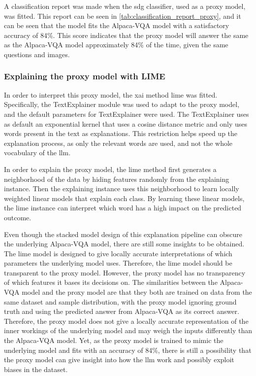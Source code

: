     A classification report was made when the \gls{sdg} classifier, used as a proxy model, was fitted. This report can be seen in \autoref{tab:classification_report_proxy}, and it can be seen that the model fits the Alpaca-VQA model with a satisfactory accuracy of 84\%. This score indicates that the proxy model will answer the same as the Alpaca-VQA model approximately 84\% of the time, given the same questions and images.

    


    \subsubsection{Explaining the proxy model with LIME}
    
    In order to interpret this proxy model, the \gls{xai} method \gls{lime} was fitted. Specifically, the TextExplainer module \cite{LimePackageLime} was used to adapt to the proxy model, and the default parameters for TextExplainer were used. The TextExplainer uses as default an exponential kernel that uses a cosine distance metric and only uses words present in the text as explanations. This restriction helps speed up the explanation process, as only the relevant words are used, and not the whole vocabulary of the \gls{llm}. 

    In order to explain the proxy model, the \gls{lime} method first generates a neighborhood of the data by hiding features randomly from the explaining instance. Then the explaining instance uses this neighborhood to learn locally weighted linear models that explain each class. By learning these linear models, the \gls{lime} instance can interpret which word has a high impact on the predicted outcome. 
    
    
    Even though the stacked model design of this explanation pipeline can obscure the underlying Alpaca-VQA model, there are still some insights to be obtained. The \gls{lime} model is designed to give locally accurate interpretations of which parameters the underlying model uses. Therefore, the \gls{lime} model should be transparent to the proxy model. However, the proxy model has no transparency of which features it bases its decisions on. 
    The similarities between the Alpaca-VQA model and the proxy model are that they both are trained on data from the same dataset and sample distribution, with the proxy model ignoring ground truth and using the predicted answer from Alpaca-VQA as its correct answer. 
    Therefore, the proxy model does not give a locally accurate representation of the inner workings of the underlying model and may weigh the inputs differently than the Alpaca-VQA model. 
    Yet, as the proxy model is trained to mimic the underlying model and fits with an accuracy of 84\%, there is still a possibility that the proxy model can give insight into how the \gls{llm} work and possibly exploit biases in the dataset.

